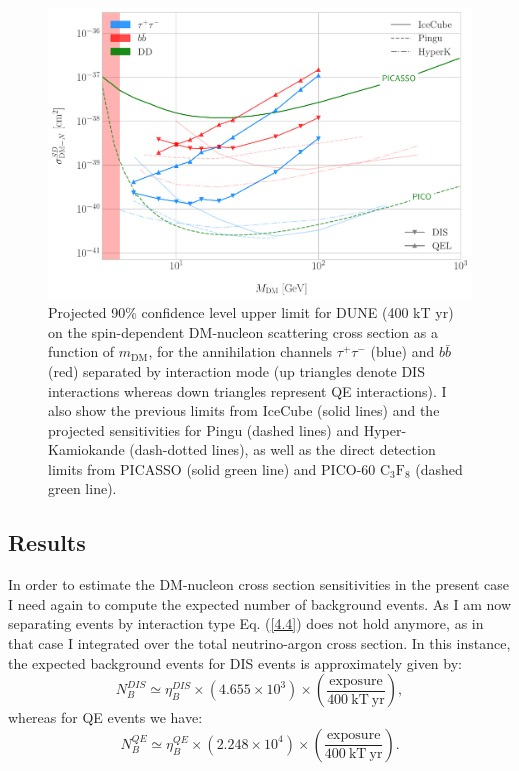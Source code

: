 \begin{figure}[t]
	\centering
	\includegraphics[width=0.95\linewidth]{Images/DM_Analysis/solardm_xsection_sd.pdf}
	\caption[Projected 90\% confidence level upper limit for DUNE (400 kT yr) on the spin-dependent DM-nucleon scattering cross section as a function of $m_{\mathrm{DM}}$, for the annihilation channels $\tau^{+}\tau^{-}$ and $b\bar{b}$ separated by interaction mode]{Projected 90\% confidence level upper limit for DUNE (400 kT yr) on the spin-dependent DM-nucleon scattering cross section as a function of $m_{\mathrm{DM}}$, for the annihilation channels $\tau^{+}\tau^{-}$ (blue) and $b\bar{b}$ (red) separated by interaction mode (up triangles denote DIS interactions whereas down triangles represent QE interactions). I also show the previous limits from IceCube \cite{IceCube2021} (solid lines) and the projected sensitivities for Pingu \cite{Chen2014} (dashed lines) and Hyper-Kamiokande \cite{Bell2021} (dash-dotted lines), as well as the direct detection limits from PICASSO \cite{Behnke2016} (solid green line) and PICO-60 $\mathrm{C}_{3}\mathrm{F}_{8}$ \cite{PICO2019} (dashed green line).}
	\label{fig:solardm_xsection_sd}
\end{figure}

\subsection{Results}

In order to estimate the DM-nucleon cross section sensitivities in the present case I need again to compute the expected number of background events. As I am now separating events by interaction type Eq. (\ref{4.4}) does not hold anymore, as in that case I integrated over the total neutrino-argon cross section. In this instance, the expected background events for DIS events is approximately given by:
\begin{equation}\label{6.11}
	N_{B}^{DIS} \simeq \eta_{B}^{DIS} \times \left(4.655 \times 10^{3}\right) \times \left(\frac{\mathrm{exposure}}{400 \ \mathrm{kT} \ \mathrm{yr}}\right),
\end{equation}
whereas for QE events we have:
\begin{equation}\label{6.12}
	N_{B}^{QE} \simeq \eta_{B}^{QE} \times \left(2.248\times 10^{4}\right) \times \left(\frac{\mathrm{exposure}}{400 \ \mathrm{kT} \ \mathrm{yr}}\right).
\end{equation}

